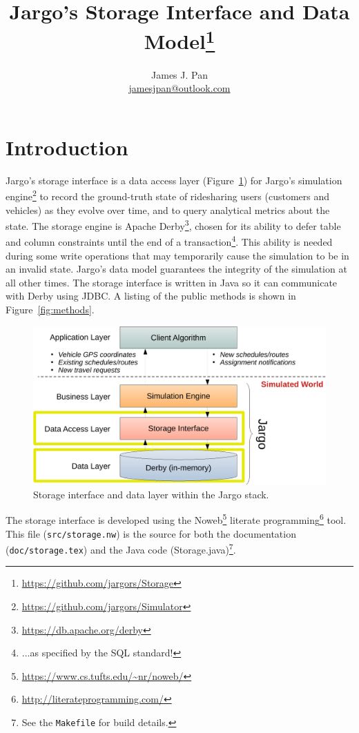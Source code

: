 \documentclass{article}
\title{Jargo's Storage Interface
  and Data Model\footnote{\url{https://github.com/jargors/Storage}}}
\author{James J. Pan\\
  \small{\href{mailto:jamesjpan@outlook.com}{jamesjpan@outlook.com}}
}
\theoremstyle{definition}
\begin{document}
\maketitle
\pagestyle{noweb}

\tableofcontents

\section{Introduction}
\label{sec:introduction}
Jargo's storage interface is a data access layer (Figure~\ref{fig:storage}) for
Jargo's simulation engine\footnote{\url{https://github.com/jargors/Simulator}}
to record the ground-truth state of ridesharing users (customers and vehicles)
as they evolve over time, and to query analytical metrics about the state.  The
storage engine is Apache Derby\footnote{\url{https://db.apache.org/derby}},
chosen for its ability to defer table and column constraints until the end of a
transaction\footnote{...as specified by the SQL standard!}.  This ability is
needed during some write operations that may temporarily cause the simulation
to be in an invalid state. Jargo's data model guarantees the integrity of the
simulation at all other times. The storage interface is written in Java so it
can communicate with Derby using JDBC. A listing of the public methods is
shown in Figure~\ref{fig:methods}.

\begin{figure}[h]
\centering
\includegraphics[width=120mm]{src/fig/storage-fig}
\caption{Storage interface and data layer within the Jargo stack.}
\label{fig:storage}
\end{figure}

The storage interface is developed using the
Noweb\footnote{\url{https://www.cs.tufts.edu/~nr/noweb/}} literate
programming\footnote{\url{http://literateprogramming.com/}} tool.  This file
({\tt{}src/storage.nw}) is the source for both the documentation
({\tt{}doc/storage.tex}) and the Java code (Storage.java)\footnote{See the
{\tt{}Makefile} for build details.}.
\end{document}
